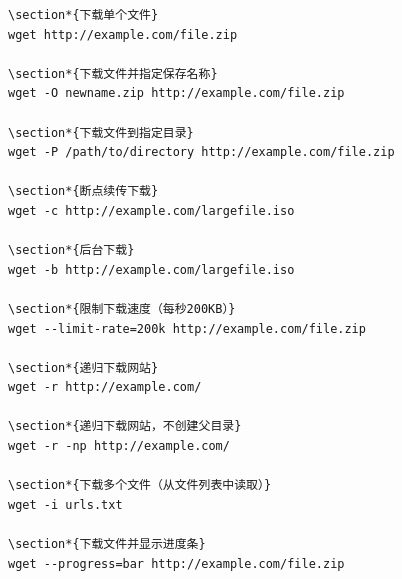 \documentclass[12pt,UTF8]{ctexbook}
\begin{document}
\begin{verbatim}
\section*{下载单个文件}
wget http://example.com/file.zip

\section*{下载文件并指定保存名称}
wget -O newname.zip http://example.com/file.zip

\section*{下载文件到指定目录}
wget -P /path/to/directory http://example.com/file.zip

\section*{断点续传下载}
wget -c http://example.com/largefile.iso

\section*{后台下载}
wget -b http://example.com/largefile.iso

\section*{限制下载速度（每秒200KB）}
wget --limit-rate=200k http://example.com/file.zip

\section*{递归下载网站}
wget -r http://example.com/

\section*{递归下载网站，不创建父目录}
wget -r -np http://example.com/

\section*{下载多个文件（从文件列表中读取）}
wget -i urls.txt

\section*{下载文件并显示进度条}
wget --progress=bar http://example.com/file.zip


\end{verbatim}
\end{document}

